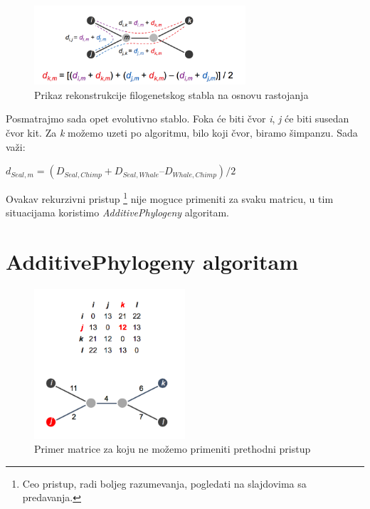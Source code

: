 \begin{figure}[h!]
\begin{center}
\includegraphics[width=0.7\textwidth]{poglavlja/7/slike/slika7.png}
\end{center}
\caption{Prikaz rekonstrukcije filogenetskog stabla na osnovu rastojanja}
\label{fig:filstab}
\end{figure}

Posmatrajmo sada opet evolutivno stablo. Foka \'ce biti \v{c}vor \textit{i}, \textit{j} \'ce biti susedan \v{c}vor kit. Za \textit{k} mo\v{z}emo uzeti po algoritmu, bilo koji \v{c}vor, biramo \v{s}impanzu. Sada va\v{z}i: 
\begin{center}
$d_{Seal, m} = (D_{Seal, Chimp} + D_{Seal, Whale} – D_{Whale, Chimp}) / 2$
\end{center}

Ovakav rekurzivni pristup \footnote{Ceo pristup, radi boljeg razumevanja, pogledati na slajdovima sa predavanja.} nije moguce primeniti za svaku matricu, u tim situacijama koristimo \textit{AdditivePhylogeny} algoritam.

\section{AdditivePhylogeny algoritam}
\label{addalg}

\begin{figure}[h!]
\begin{center}
\includegraphics[width=0.5\textwidth]{poglavlja/7/slike/slika6.png}
\end{center}
\caption{Primer matrice za koju ne mo\v{z}emo primeniti prethodni pristup}
\label{fig:pmzknppp}
\end{figure}

